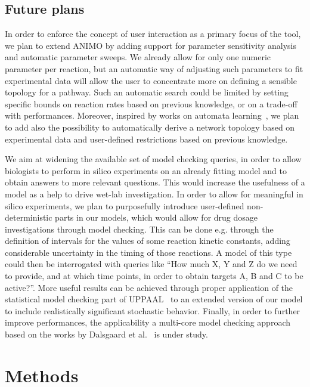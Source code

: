 \documentclass{bmcart}
\begin{document}
\subsection*{Future plans}
In order to enforce the concept of user interaction as a primary focus of the tool, we plan to extend
ANIMO by adding support for parameter sensitivity analysis and automatic parameter sweeps.
We already allow for only one numeric parameter per reaction, but an automatic way of adjusting such
parameters to fit experimental data will allow the user to concentrate more on defining a sensible topology for a pathway.
Such an automatic search could be limited by setting specific bounds on reaction rates based on previous knowledge,
or on a trade-off with performances.
Moreover, inspired by works on automata learning~\cite{test-based-modelling}, we plan to add also the possibility
to automatically derive a network topology based on experimental data and user-defined restrictions based on
previous knowledge.

We aim at widening the available set of model checking queries, in order to allow biologists to perform
in silico experiments on an already fitting model and to obtain answers to more relevant questions.
This would increase the usefulness of a model as a help to drive wet-lab investigation.
In order to allow for meaningful in silico experiments, we plan to purposefully introduce user-defined non-deterministic 
parts in our models, which would allow for drug dosage investigations through model checking.
This can be done e.g. through the definition of intervals for the values of some reaction kinetic constants,
adding considerable uncertainty in the timing of those reactions.
A model of this type could then be interrogated with queries like ``How much X, Y and Z do we need to provide,
and at which time points, in order to obtain targets A, B and C to be active?''.
More useful results can be achieved through proper application of the statistical model checking part of UPPAAL~\cite{uppaal-smc} to
an extended version of our model to include realistically significant stochastic behavior.
Finally, in order to further improve performances, the applicability a multi-core model checking approach based on the
works by Dalsgaard et al.~\cite{uppaal-multi-core1}
is under study.



\section*{Methods}
\end{document}
